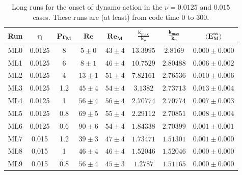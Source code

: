\documentclass[12pt,a4paper]{report}
\begin{document}
\begin{table}[h]
\begin{center}
\begin{tabular}{||c|c|c|c|c|c|c|c||}
\hline
\textbf{Run} & $ \bm{\eta} $ & $ \bm{ Pr_M} $ & $ \bm{ Re} $ & $ \bm{ Re_M} $ & $ \bm{ \frac{k_{max}}{k_\nu}} $ & $ \bm{ \frac{k_{max}}{k_\eta}} $ & $ \bm{ \langle E_M^{ss}} \rangle $ \\ \hline
ML0 & 0.0125 & 8 & $ 5 \pm 0 $ & $ 43 \pm 4 $ & $ 13.3995 $ & $ 2.8169 $ & $ 0.000 \pm 0.000 $ \\ \hline
ML1 & 0.0125 & 6 & $ 8 \pm 1 $ & $ 46 \pm 4 $ & $ 10.7529 $ & $ 2.80488 $ & $ 0.006 \pm 0.002 $ \\ \hline
ML2 & 0.0125 & 4 & $ 13 \pm 1 $ & $ 51 \pm 4 $ & $ 7.82161 $ & $ 2.76536 $ & $ 0.010 \pm 0.006 $ \\ \hline
ML3 & 0.0125 & 1.2 & $ 45 \pm 4 $ & $ 54 \pm 4 $ & $ 3.1382 $ & $ 2.73713 $ & $ 0.013 \pm 0.004 $ \\ \hline
ML4 & 0.0125 & 1 & $ 56 \pm 4 $ & $ 56 \pm 4 $ & $ 2.70774 $ & $ 2.70774 $ & $ 0.007 \pm 0.003 $ \\ \hline
ML5 & 0.0125 & 0.8 & $ 69 \pm 5 $ & $ 55 \pm 4 $ & $ 2.29112 $ & $ 2.70851 $ & $ 0.008 \pm 0.004 $ \\ \hline
ML6 & 0.0125 & 0.6 & $ 90 \pm 6 $ & $ 54 \pm 4 $ & $ 1.84338 $ & $ 2.70399 $ & $ 0.001 \pm 0.001 $ \\ \hline
ML7 & 0.015 & 1.2 & $ 39 \pm 3 $ & $ 47 \pm 4 $ & $ 1.73471 $ & $ 1.51301 $ & $ 0.001 \pm 0.000 $ \\ \hline
ML8 & 0.015 & 1 & $ 46 \pm 4 $ & $ 46 \pm 4 $ & $ 1.52046 $ & $ 1.52046 $ & $ 0.000 \pm 0.000 $ \\ \hline
ML9 & 0.015 & 0.8 & $ 56 \pm 4 $ & $ 45 \pm 3 $ & $ 1.2787 $ & $ 1.51165 $ & $ 0.000 \pm 0.000 $ \\ \hline
\end{tabular}
\end{center}
\caption{Long runs for the onset of dynamo action in the $\nu=0.0125\text{ and }0.015$ cases. These runs are (at least) from code time 0 to 300.}
\label{tableB3}
\end{table}








\end{document}
